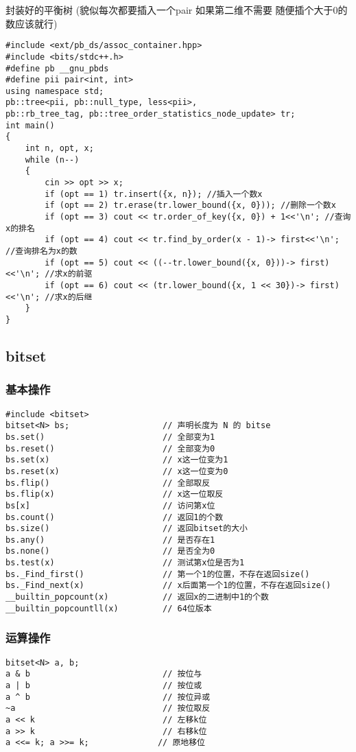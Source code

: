 \documentclass[a4paper, fontset=none]{ctexart}
\begin{document}
封装好的平衡树 (貌似每次都要插入一个pair 如果第二维不需要 随便插个大于0的数应该就行)

\begin{verbatim}
#include <ext/pb_ds/assoc_container.hpp>
#include <bits/stdc++.h>
#define pb __gnu_pbds
#define pii pair<int, int>
using namespace std;
pb::tree<pii, pb::null_type, less<pii>,
pb::rb_tree_tag, pb::tree_order_statistics_node_update> tr;
int main()
{
    int n, opt, x;
    while (n--)
    {
        cin >> opt >> x;
        if (opt == 1) tr.insert({x, n}); //插入一个数x
        if (opt == 2) tr.erase(tr.lower_bound({x, 0})); //删除一个数x
        if (opt == 3) cout << tr.order_of_key({x, 0}) + 1<<'\n'; //查询x的排名
        if (opt == 4) cout << tr.find_by_order(x - 1)-> first<<'\n'; //查询排名为x的数
        if (opt == 5) cout << ((--tr.lower_bound({x, 0}))-> first)<<'\n'; //求x的前驱
        if (opt == 6) cout << (tr.lower_bound({x, 1 << 30})-> first)<<'\n'; //求x的后继
    }
}
\end{verbatim}
\subsection{bitset}

\subsubsection{基本操作}
\begin{verbatim}
#include <bitset>
bitset<N> bs;                   // 声明长度为 N 的 bitse
bs.set()                        // 全部变为1
bs.reset()                      // 全部变为0
bs.set(x)                       // x这一位变为1
bs.reset(x)                     // x这一位变为0
bs.flip()                       // 全部取反
bs.flip(x)                      // x这一位取反
bs[x]                           // 访问第x位
bs.count()                      // 返回1的个数
bs.size()                       // 返回bitset的大小
bs.any()                        // 是否存在1
bs.none()                       // 是否全为0
bs.test(x)                      // 测试第x位是否为1
bs._Find_first()                // 第一个1的位置，不存在返回size()
bs._Find_next(x)                // x后面第一个1的位置，不存在返回size()
__builtin_popcount(x)           // 返回x的二进制中1的个数
__builtin_popcountll(x)         // 64位版本
\end{verbatim}

\subsubsection{运算操作}
\begin{verbatim}
bitset<N> a, b;
a & b                           // 按位与
a | b                           // 按位或
a ^ b                           // 按位异或
~a                              // 按位取反
a << k                          // 左移k位
a >> k                          // 右移k位
a <<= k; a >>= k;              // 原地移位
\end{verbatim}
\end{document}
